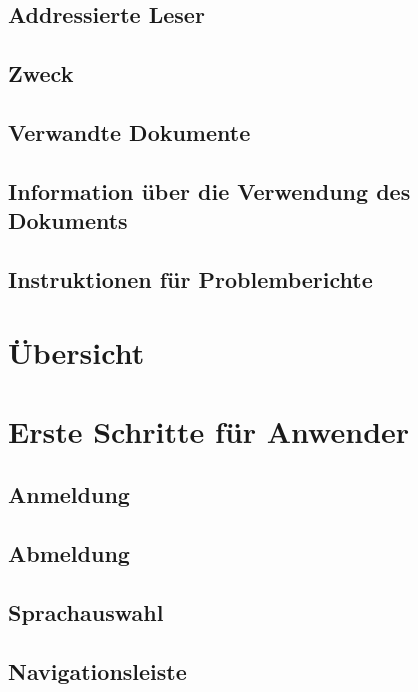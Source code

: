 \documentclass[enabledeprecatedfontcommands,fontsize=12pt,paper=a4,twoside]{scrartcl}
\begin{document}
\subsection{Addressierte Leser}
\subsection{Zweck}
\subsection{Verwandte Dokumente}
\subsection{Information über die Verwendung des Dokuments}
\subsection{Instruktionen für Problemberichte}


\newpage
\section{Übersicht}


\newpage
\section{Erste Schritte für Anwender}
\subsection{Anmeldung}
\subsection{Abmeldung}
\subsection{Sprachauswahl}
\subsection{Navigationsleiste}


\newpage
\end{document}
